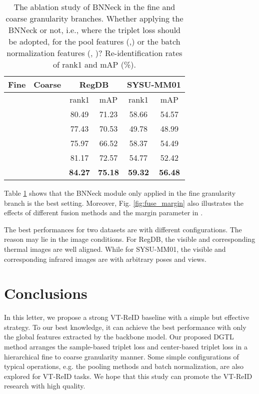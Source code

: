 \documentclass[journal]{IEEEtran}
\begin{document}
\begin{table}
\scriptsize
\caption{The ablation study of BNNeck \cite{Luo2019ASB} in the fine and coarse granularity branches. Whether applying the BNNeck or not, i.e., where the triplet loss should be adopted, for the pool features (,)  or the batch normalization features (, )? Re-identification rates of rank1 and mAP (\%).}
\label{tab:ablation_bnneck}
  \centering
\begin{tabular}{c|c|c|c|c|c}
   \toprule[2pt]
    Fine & Coarse & \multicolumn{2}{c|}{RegDB} & \multicolumn{2}{c}{SYSU-MM01}\\ \hline
      &  &  rank1 & mAP & rank1 & mAP \\ \toprule[1pt]
      &  &  80.49  & 71.23 & 58.66 & 54.57  \\
      &  &  77.43  & 70.53 & 49.78 & 48.99   \\
      &  & 75.97  & 66.52 & 58.37 & 54.49     \\
      &  & 81.17  & 72.57 & 54.77 & 52.42  \\
      &  & \textbf{84.27}  & \textbf{75.18} & \textbf{59.32} &  \textbf{56.48}   \\
     \toprule[2pt]
  \end{tabular}
\end{table}

Table \ref{tab:ablation_bnneck} shows that the BNNeck \cite{Luo2019ASB} module only applied in the fine granularity branch is the best setting.
Moreover, Fig. \ref{fig:fuse_margin} also illustrates the effects of different fusion methods and the margin parameter in .

The best performances for two datasets are with different configurations. The reason may lie in the image conditions. For RegDB, the visible and corresponding thermal images are well aligned. While for SYSU-MM01, the visible and corresponding infrared images are with arbitrary poses and views.

\section{Conclusions}
In this letter, we propose a strong VT-ReID baseline with a simple but effective strategy. To our best knowledge, it can achieve the best performance with only the global features extracted by the backbone model.
Our proposed DGTL method arranges the sample-based triplet loss and center-based triplet loss in a hierarchical fine to coarse granularity manner. Some simple configurations of typical operations, e.g. the pooling methods and batch normalization, are also explored for VT-ReID tasks.
We hope that this study can promote the VT-ReID research with high quality.





\end{document}
